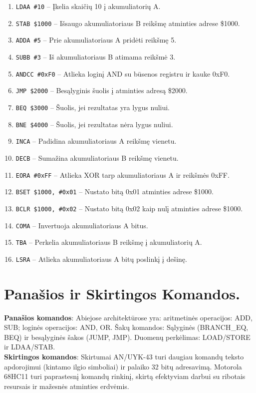 \documentclass[a4paper,12pt]{article}
\begin{document}
\begin{enumerate}
    \item \texttt{LDAA \#10} – Įkelia skaičių 10 į akumuliatorių A.
    \item \texttt{STAB \$1000} – Išsaugo akumuliatoriaus B reikšmę atminties adrese \$1000.
    \item \texttt{ADDA \#5} – Prie akumuliatoriaus A pridėti reikšmę 5.
    \item \texttt{SUBB \#3} – Iš akumuliatoriaus B atimama reikšmė 3.
    \item \texttt{ANDCC \#0xF0} – Atlieka loginį AND su būsenos registru ir kauke 0xF0.
    \item \texttt{JMP \$2000} – Besąlyginis šuolis į atminties adresą \$2000.
    \item \texttt{BEQ \$3000} – Šuolis, jei rezultatas yra lygus nuliui.
    \item \texttt{BNE \$4000} – Šuolis, jei rezultatas nėra lygus nuliui.
    \item \texttt{INCA} – Padidina akumuliatoriaus A reikšmę vienetu.
    \item \texttt{DECB} – Sumažina akumuliatoriaus B reikšmę vienetu.
    \item \texttt{EORA \#0xFF} – Atlieka XOR tarp akumuliatoriaus A ir reikšmės 0xFF.
    \item \texttt{BSET \$1000, \#0x01} – Nustato bitą 0x01 atminties adrese \$1000.
    \item \texttt{BCLR \$1000, \#0x02} – Nustato bitą 0x02 kaip nulį atminties adrese \$1000.
    \item \texttt{COMA} – Invertuoja akumuliatoriaus A bitus.
    \item \texttt{TBA} – Perkelia akumuliatoriaus B reikšmę į akumuliatorių A.
    \item \texttt{LSRA} – Atlieka akumuliatoriaus A bitų poslinkį į dešinę.
\end{enumerate}
\section*{Panašios ir Skirtingos Komandos.}
\textbf{Panašios komandos}: 
Abiejose architektūrose yra: aritmetinės operacijos: ADD, SUB; loginės operacijos: AND, OR.
Šakų komandos: Sąlyginės (BRANCH_EQ, BEQ) ir besąlyginės šakos (JUMP, JMP).
Duomenų perkėlimas: LOAD/STORE ir LDAA/STAB.\\
\textbf{Skirtingos komandos}: 
Skirtumai
AN/UYK-43 turi daugiau komandų teksto apdorojimui (kintamo ilgio simboliai) ir palaiko 32 bitų adresavimą.
Motorola 68HC11 turi paprastesnį komandų rinkinį, skirtą efektyviam darbui su ribotais resursais ir mažesnės atminties erdvėmis.
\end{document}

